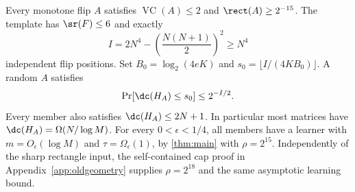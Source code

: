 \begin{theorem}\label{thm:construction}
Every monotone flip $A$ satisfies $\operatorname{VC}(A)\le2$ and $\rect(A)\ge2^{-15}$. The template has $\sr(F)\le6$ and exactly
\begin{equation}\label{eq:I}
 I=2N^4-\left(\frac{N(N+1)}2\right)^2\ge N^4
\end{equation}
independent flip positions. Set $B_0=\log_2(4eK)$ and $s_0=\lfloor I/(4KB_0)\rfloor$. A random $A$ satisfies
\[
 \Pr[\dc(H_A)\le s_0]\le2^{-I/2}.
\]
Every member also satisfies $\dc(H_A)\le2N+1$. In particular most matrices have $\dc(H_A)=\Omega(N/\log M)$. For every $0<\epsilon<1/4$, all members have a learner with $m=O_\epsilon(\log M)$ and $\tau=\Omega_\epsilon(1)$, by \cref{thm:main} with $\rho=2^{15}$. Independently of the sharp rectangle input, the self-contained cap proof in Appendix~\ref{app:oldgeometry} supplies $\rho=2^{18}$ and the same asymptotic learning bound.
\end{theorem}

